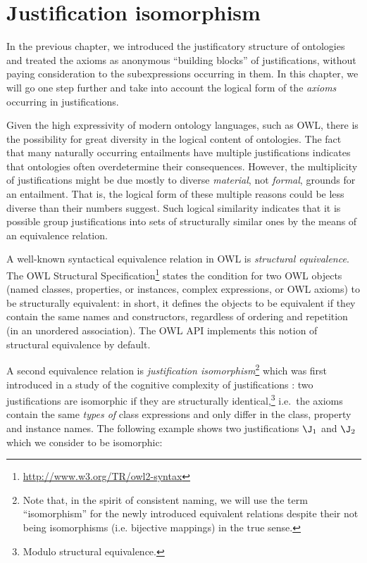 \chapter{Justification isomorphism}
\label{chap:iso}

In the previous chapter, we introduced the justificatory structure of ontologies and treated the axioms as anonymous \enquote{building blocks} of justifications, without paying consideration to the subexpressions occurring in them. In this chapter, we will go one step further and take into account the logical form of the \emph{axioms} occurring in justifications. 

Given the high expressivity of modern ontology languages, such as OWL, there is the possibility for great diversity in the logical content of ontologies. The fact that many naturally occurring entailments have multiple justifications indicates that ontologies often overdetermine their consequences. However, the multiplicity of justifications might be due mostly to diverse \emph{material}, not \emph{formal}, grounds for an entailment. That is, the logical form of these multiple reasons could be less diverse than their numbers suggest. Such logical similarity indicates that it is possible group justifications into sets of structurally similar ones by the means of an equivalence relation.

A well-known syntactical equivalence relation in OWL is \emph{structural equivalence}. The OWL Structural Specification\footnote{\url{http://www.w3.org/TR/owl2-syntax}} states the condition for two OWL objects (named classes, properties, or instances, complex expressions, or OWL axioms) to be structurally equivalent: in short, it defines the objects to be equivalent if they contain the same names and constructors, regardless of ordering and repetition (in an unordered association). The OWL API implements this notion of structural equivalence by default.

A second equivalence relation is \emph{justification isomorphism}\footnote{Note that, in the spirit of consistent naming, we will use the term \enquote{isomorphism} for the newly introduced equivalent relations despite their not being isomorphisms (i.e. bijective mappings) in the true sense.} which was first introduced in a study of the cognitive complexity of justifications \cite{horridge11gj}: two justifications are isomorphic if they are structurally identical,\footnote{Modulo structural equivalence.} i.e.\ the axioms contain the same \emph{types of} class expressions and only differ in the class, property and instance names. The following example shows two justifications $\J_{1}$ and $\J_{2}$ which we consider to be isomorphic:


